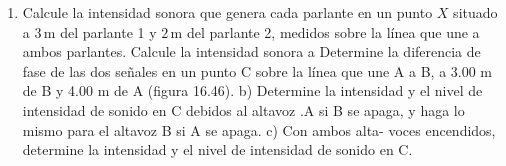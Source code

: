 \documentclass[a4paper,12pt]{article}
\begin{document}
\begin{enumerate}
	\begin{enumerate}
		\item Calcule la intensidad sonora que genera cada parlante en un punto $X$ situado a $3$\,m del parlante 1 y $2$\,m del parlante 2, medidos sobre la línea que une a ambos parlantes.
			Calcule la intensidad sonora a 
		Determine la diferencia de fase de las dos señales en un punto
		C sobre la línea que une A a B, a 3.00 m de B y 4.00 m de A
		(figura 16.46). b) Determine la intensidad y el nivel de
		intensidad de sonido en C debidos al altavoz .A si B se apaga,
		 y haga lo mismo para el altavoz B si A se apaga. c) Con ambos
		alta- voces encendidos, determine la intensidad y el nivel de
		intensidad de sonido en C.
\end{enumerate}
\end{enumerate}
\end{document}
